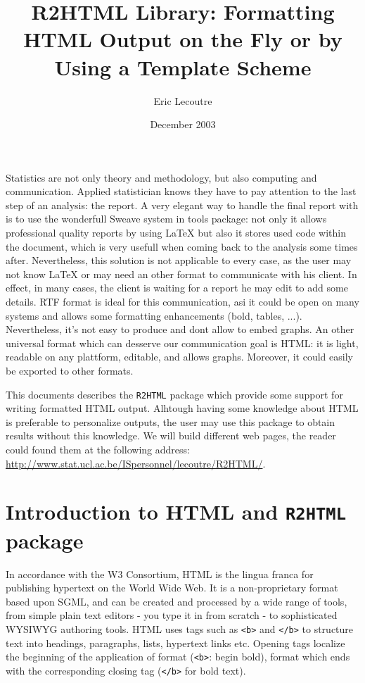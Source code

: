 \documentclass[a4paper]{article}
\title{R2HTML Library: Formatting HTML Output on the Fly or by Using a Template Scheme}
\author{Eric Lecoutre}
\newcommand{\HTML}{{\tt R2HTML}}
\begin{document}
\date{December 2003}

\maketitle

Statistics are not only theory and methodology, but also computing and communication. Applied statistician knows they have to pay attention to the last step of an analysis: the report. A very elegant way to handle the final report with \R{} is to use the wonderfull Sweave system \cite{Leish:sweave} in tools package: not only it allows professional quality reports by using \LaTeX{} but also it stores used code within the document, which is very usefull when coming back to the analysis some times after. Nevertheless, this solution is not applicable to every case, as the user may not know \LaTeX{}  or may need an other format to communicate with his client. In effect, in many cases, the client is waiting for a report he may edit to add some details. RTF format is ideal for this communication, asi it could be open on many systems and allows some formatting enhancements (bold, tables, ...). Nevertheless, it's not easy to produce and dont allow to embed graphs. An other universal format which can desserve our communication  goal is HTML: it is light, readable on any plattform, editable, and allows graphs. Moreover, it could easily be exported to other formats.

This documents describes the \HTML{} package which provide some support for writing formatted HTML output. Alhtough having some knowledge about HTML is preferable to personalize outputs, the user may use this package to obtain results without this knowledge. We will build different web pages, the reader could found them at the following address: \href{http://www.stat.ucl.ac.be/ISpersonnel/lecoutre/R2HTML/}{http://www.stat.ucl.ac.be/ISpersonnel/lecoutre/R2HTML/}.


\section*{Introduction to HTML and \HTML{} package}

In accordance with the W3 Consortium, HTML is the lingua franca for publishing hypertext on the World Wide Web.  It is a non-proprietary format based upon SGML, and can be created and processed by a wide range of tools, from simple plain text editors - you type it in from scratch - to sophisticated WYSIWYG authoring tools. HTML uses tags such as \verb+<b>+ and \verb+</b>+ to structure text into headings, paragraphs, lists, hypertext links etc. Opening tags localize the beginning of the application of format (\verb+<b>+: begin bold), format which ends with the corresponding closing tag (\verb+</b>+ for bold text).
\end{document}
